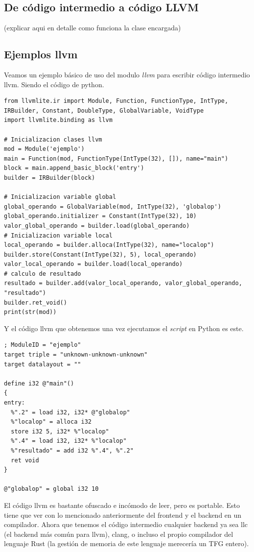 \subsection{De código intermedio a código LLVM}
(explicar aqui en detalle como funciona la clase encargada)
\subsection{Ejemplos llvm}
Veamos un ejemplo básico de uso del modulo \textit{llvm} para escribir código intermedio llvm. Siendo el código de python.
\begin{lstlisting}[style=pythonStyle]
from llvmlite.ir import Module, Function, FunctionType, IntType, IRBuilder, Constant, DoubleType, GlobalVariable, VoidType
import llvmlite.binding as llvm

# Inicializacion clases llvm
mod = Module('ejemplo')
main = Function(mod, FunctionType(IntType(32), []), name="main")
block = main.append_basic_block('entry')
builder = IRBuilder(block)

# Inicializacion variable global
global_operando = GlobalVariable(mod, IntType(32), 'globalop')
global_operando.initializer = Constant(IntType(32), 10)
valor_global_operando = builder.load(global_operando)
# Inicializacion variable local
local_operando = builder.alloca(IntType(32), name="localop")
builder.store(Constant(IntType(32), 5), local_operando)
valor_local_operando = builder.load(local_operando)
# calculo de resultado
resultado = builder.add(valor_local_operando, valor_global_operando, "resultado")
builder.ret_void()
print(str(mod))
\end{lstlisting}
Y el código llvm que obtenemos una vez ejecutamos el \textit{script} en Python es este.
\begin{lstlisting}[style=pythonStyle]
; ModuleID = "ejemplo"
target triple = "unknown-unknown-unknown"
target datalayout = ""

define i32 @"main"()
{
entry:
  %".2" = load i32, i32* @"globalop"
  %"localop" = alloca i32
  store i32 5, i32* %"localop"
  %".4" = load i32, i32* %"localop"
  %"resultado" = add i32 %".4", %".2"
  ret void
}

@"globalop" = global i32 10
\end{lstlisting}
El código llvm es bastante ofuscado e incómodo de leer, pero es portable. Esto tiene que ver con lo mencionado anteriormente del frontend y el backend en un compilador. Ahora que tenemos el código intermedio cualquier backend ya sea llc (el backend más común para llvm), clang, o incluso el propio compilador del lenguaje Rust (la gestión de memoria de este lenguaje merecería un TFG entero).\\\\
